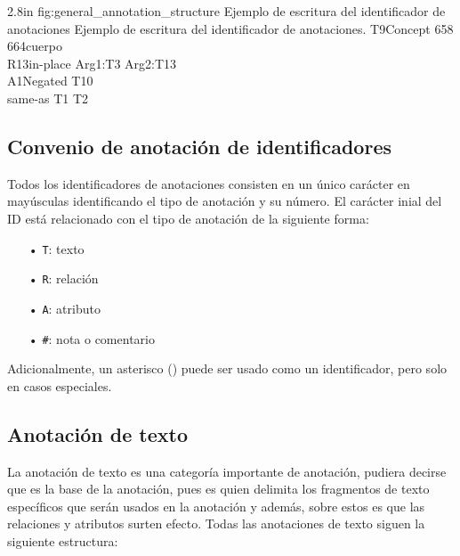 \begin{annexample}
	[backgroundcolor=cyan!13]
	{2.8in}
	{fig:general_annotation_structure}
	{Ejemplo de escritura del identificador de anotaciones}
	{Ejemplo de escritura del identificador de anotaciones.}
	T9\space\space Concept 658 664\space cuerpo\\
	R13\space in-place Arg1:T3 Arg2:T13\\
	A1\space\space Negated T10\\
	\textasteriskcentered\space\space\space same-as T1 T2
\end{annexample}

\subsection{Convenio de anotación de identificadores}
\label{subsection:id_annotation_conventions}
Todos los identificadores de anotaciones consisten en un único carácter en mayúsculas identificando el tipo de anotación y su número. El carácter inial del ID está relacionado con el tipo de anotación de la siguiente forma:

\begin{center}
	\begin{itemize}
		\item[•] \texttt{T}: texto
		\vspace{-0.1in}
		\item[•] \texttt{R}: relación
		\vspace{-0.1in}
		\item[•] \texttt{A}: atributo
		\vspace{-0.1in}
		\item[•] \texttt{\#}: nota o comentario
	\end{itemize}
\end{center}

Adicionalmente, un asterisco (\doublequote{\,*\,}) puede ser usado como un identificador, pero solo en casos especiales.

\subsection{Anotación de texto}
La anotación de texto es una categoría importante de anotación, pudiera decirse que es la base de la anotación, pues es quien delimita los fragmentos de texto específicos que serán usados en la anotación y además, sobre estos es que las relaciones y atributos surten efecto. Todas las anotaciones de texto siguen la siguiente estructura:

